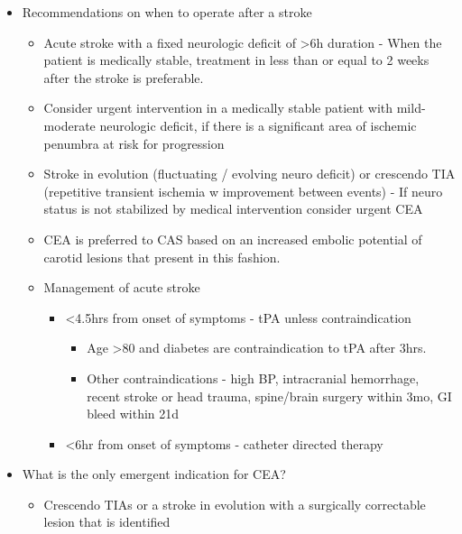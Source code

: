 \documentclass[
]{book}
\providecommand{\tightlist}{%
  \setlength{\itemsep}{0pt}\setlength{\parskip}{0pt}}
\begin{document}
\begin{itemize}
\item
  Recommendations on when to operate after a stroke

  \begin{itemize}
  \item
    Acute stroke with a fixed neurologic deficit of \textgreater6h duration -
    When the patient is medically stable, treatment in less than or
    equal to 2 weeks after the stroke is preferable.
    \citep{rothwellEndarterectomySymptomaticCarotid2004, meershoekTimingCarotidIntervention2018}
  \item
    Consider urgent intervention in a medically stable patient with
    mild-moderate neurologic deficit, if there is a significant area
    of ischemic penumbra at risk for progression
  \item
    Stroke in evolution (fluctuating / evolving neuro deficit) or
    crescendo TIA (repetitive transient ischemia w improvement
    between events) - If neuro status is not stabilized by medical
    intervention consider urgent CEA
  \item
    CEA is preferred to CAS based on an increased embolic potential
    of carotid lesions that present in this fashion.
    \citep{rantnerEarlyEndarterectomyCarries2017}
  \item
    Management of acute stroke \citep{powers2018GuidelinesEarly2018}

    \begin{itemize}
    \item
      \textless4.5hrs from onset of symptoms - tPA unless
      contraindication

      \begin{itemize}
      \item
        Age \textgreater80 and diabetes are contraindication to tPA after
        3hrs.
      \item
        Other contraindications - high BP, intracranial
        hemorrhage, recent stroke or head trauma, spine/brain
        surgery within 3mo, GI bleed within 21d
      \end{itemize}
    \item
      \textless6hr from onset of symptoms - catheter directed therapy
    \end{itemize}
  \end{itemize}
\item
  What is the only emergent indication for CEA?

  \begin{itemize}
  \tightlist
  \item
    Crescendo TIAs or a stroke in evolution with a surgically
    correctable lesion that is identified
  \end{itemize}
\end{itemize}
\end{document}
